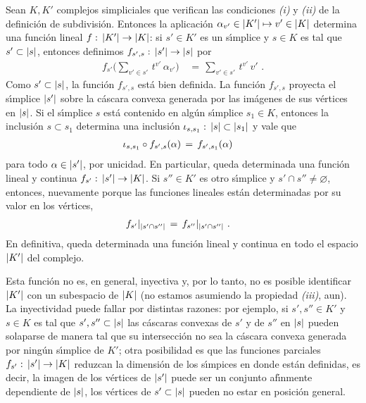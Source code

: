 \begin{obsDefinicionSubdivisiones}\label{obs:definicionsubdivisiones}
	Sean $K,K'$ complejos simpliciales que verifican las condiciones
	\emph{(i)} y \emph{(ii)} de la definici\'{o}n de subdivisi\'{o}n.
	Entonces la aplicaci\'{o}n
	$\alpha_{v'}\in\geom{K'}\mapsto v'\in\geom{K}$ determina una
	funci\'{o}n lineal $f:\,\geom{K'}\rightarrow\geom{K}$: si $s'\in K'$ es
	un s\'{\i}mplice y $s\in K$ es tal que $s'\subset\geom{s}$, entonces
	definimos $f_{s',s}:\,\geom{s'}\rightarrow\geom{s}$ por
	\begin{align*}
		f_{s'}\Big(\sum_{v'\in s'}\,t^{v'}\,\alpha_{v'}\Big) & \,=\,
			\sum_{v'\in s'}\,t^{v'}\,v'
		\text{ .}
	\end{align*}
	Como $s'\subset\geom{s}$, la funci\'{o}n $f_{s',s}$ est\'{a} bien
	definida. La funci\'{o}n $f_{s',s}$ proyecta el s\'{\i}mplice
	$\geom{s'}$ sobre la c\'{a}scara convexa generada por las im\'{a}genes
	de sus v\'{e}rtices en $\geom{s}$. Si el s\'{\i}mplice $s$ est\'{a}
	contenido en alg\'{u}n s\'{\i}mplice $s_{1}\in K$, entonces la
	inclusi\'{o}n $s\subset s_{1}$ determina una inclusi\'{o}n
	$\inc[s,s_{1}]:\,\geom{s}\subset\geom{s_{1}}$ y vale que
	\begin{align*}
		\inc[s,s_{1}]\circ f_{s',s}(\alpha) & \,=\,
			f_{s',s_{1}}(\alpha)
	\end{align*}
	para todo $\alpha\in\geom{s'}$, por unicidad. En particular,
	queda determinada una funci\'{o}n lineal y continua
	$f_{s'}:\,\geom{s'}\rightarrow\geom{K}$. Si $s''\in K'$ es otro
	s\'{\i}mplice y $s'\cap s''\not=\varnothing$, entonces, nuevamente
	porque las funciones lineales est\'{a}n determinadas por su valor
	en los v\'{e}rtices,
	\begin{align*}
		f_{s'}|_{\geom{s'\cap s''}} & \,=\,f_{s''}|_{\geom{s'\cap s''}}
		\text{ .}
	\end{align*}
	En definitiva, queda determinada una funci\'{o}n lineal y continua en
	todo el espacio $\geom{K'}$ del complejo.

	Esta funci\'{o}n no es, en general, inyectiva y, por lo tanto, no es
	posible identificar $\geom{K'}$ con un subespacio de $\geom{K}$ (no
	estamos asumiendo la propiedad \emph{(iii)}, aun). La inyectividad
	puede fallar por distintas razones: por ejemplo, si
	$s',s''\in K'$ y $s\in K$ es tal que $s',s''\subset\geom{s}$
	las c\'{a}scaras convexas de $s'$ y de $s''$ en $\geom{s}$ pueden
	solaparse de manera tal que su intersecci\'{o}n no sea la
	c\'{a}scara convexa generada por ning\'{u}n s\'{\i}mplice de $K'$;
	otra posibilidad es que las funciones parciales
	$f_{s'}:\,\geom{s'}\rightarrow\geom{K}$ reduzcan la dimensi\'{o}n de
	los s\'{\i}mpices en donde est\'{a}n definidas, es decir,
	la imagen de los v\'{e}rtices de $\geom{s'}$ puede ser un conjunto
	af\'{\i}nmente dependiente de $\geom{s}$, los v\'{e}rtices de
	$s'\subset\geom{s}$ pueden no estar en posici\'{o}n general.


\end{obsDefinicionSubdivisiones}
